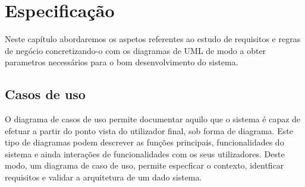 \chapter{Especificação}

Neste capítulo abordaremos os aspetos referentes ao estudo de requisitos e regras de negócio concretizando-o com os diagramas de UML de modo a obter parametros necessários para o bom desenvolvimento do sistema.

\section{Casos de uso}

O diagrama de casos de uso permite documentar aquilo que o sistema é capaz de
efetuar a partir do ponto vista do utilizador final, sob forma de diagrama. Este tipo
de diagramas podem descrever as funções principais, funcionalidades do sistema e ainda
interações de funcionalidades com os seus utilizadores.
Deste modo, um diagrama de caso de uso, permite especficar o contexto, identficar
requisitos e validar a arquitetura de um dado sistema.

\newpage

\newpage


\newpage


\newpage


\newpage


\newpage


\newpage


\newpage


\newpage


\newpage


\newpage


\newpage